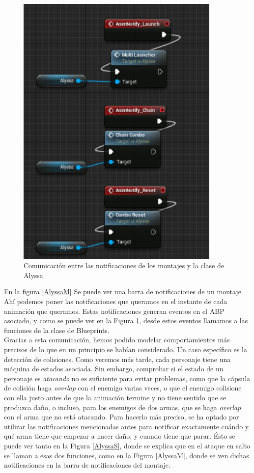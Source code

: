 \begin{figure}[H]
  \centering
  \includegraphics[width=10cm]{./images/Notifs_ABP.png}
  \caption{Comunicación entre las notificaciones de los montajes y la clase de Alyssa}
  \label{AlyssaABP}
\end{figure}


En la figura \ref{AlyssaM} Se puede ver una barra de notificaciones de un montaje. Ahí podemos poner las notificaciones que queramos en el instante de cada animación que queramos. Estas notificaciones generan eventos en el \ac{ABP} asociado, y como se puede ver en la Figura \ref{AlyssaABP}, desde estos eventos llamamos a las funciones de la clase de Blueprints.
\\

Gracias a esta comunicación, hemos podido modelar comportamientos más precisos de lo que en un principio se habían considerado. Un caso específico es la detección de colisiones. Como veremos más tarde, cada personaje tiene una máquina de estados asociada. Sin embargo, comprobar si el estado de un personaje es \textit{atacando} no es suficiente para evitar problemas, como que la cápsula de colisión haga \textit{overlap} con el enemigo varias veces, o que el enemigo colisione con ella justo antes de que la animación termine y no tiene sentido que se produzca daño, o incluso, para los enemigos de dos armas, que se haga \textit{overlap} con el arma que no está atacando. Para hacerlo más preciso, se ha optado por utilizar las notificaciones mencionadas antes para notificar exactamente cuándo y qué arma tiene que empezar a hacer daño, y cuando tiene que parar. Ésto se puede ver tanto en la Figura \ref{AlyssaS}, donde se explica que en el ataque en salto se llaman a esas dos funciones, como en la Figura \ref{AlyssaM}, donde se ven dichas notificaciones en la barra de notificaciones del montaje.

